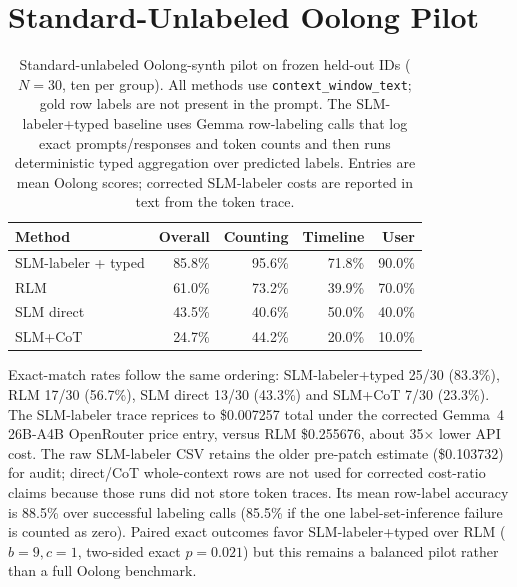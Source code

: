 \documentclass[letterpaper]{article}
\begin{document}
\section{Standard-Unlabeled Oolong Pilot}

\begin{table}[!t]
\centering
\small
\setlength{\tabcolsep}{4pt}
\begin{tabular}{@{}lrrrr@{}}
\toprule
\textbf{Method} & \textbf{Overall} & \textbf{Counting} & \textbf{Timeline} & \textbf{User} \\
\midrule
SLM-labeler + typed & 85.8\% & 95.6\% & 71.8\% & 90.0\% \\
RLM & 61.0\% & 73.2\% & 39.9\% & 70.0\% \\
SLM direct & 43.5\% & 40.6\% & 50.0\% & 40.0\% \\
SLM+CoT & 24.7\% & 44.2\% & 20.0\% & 10.0\% \\
\bottomrule
\end{tabular}
\caption{Standard-unlabeled Oolong-synth pilot on frozen held-out IDs ($N=30$, ten per group). All methods use \texttt{context\_window\_text}; gold row labels are not present in the prompt. The SLM-labeler+typed baseline uses Gemma row-labeling calls that log exact prompts/responses and token counts and then runs deterministic typed aggregation over predicted labels. Entries are mean Oolong scores; corrected SLM-labeler costs are reported in text from the token trace.}
\label{tab:supp-oolong-standard}
\end{table}

Exact-match rates follow the same ordering: SLM-labeler+typed 25/30 (83.3\%), RLM 17/30 (56.7\%), SLM direct 13/30 (43.3\%) and SLM+CoT 7/30 (23.3\%). The SLM-labeler trace reprices to \$0.007257 total under the corrected Gemma~4 26B-A4B OpenRouter price entry, versus RLM \$0.255676, about 35$\times$ lower API cost. The raw SLM-labeler CSV retains the older pre-patch estimate (\$0.103732) for audit; direct/CoT whole-context rows are not used for corrected cost-ratio claims because those runs did not store token traces. Its mean row-label accuracy is 88.5\% over successful labeling calls (85.5\% if the one label-set-inference failure is counted as zero). Paired exact outcomes favor SLM-labeler+typed over RLM ($b=9,c=1$, two-sided exact $p=0.021$) but this remains a balanced pilot rather than a full Oolong benchmark.
\end{document}
